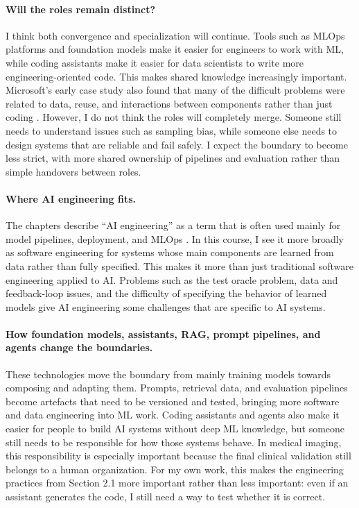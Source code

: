 \documentclass[11pt,a4paper]{article}
\begin{document}
\paragraph{Will the roles remain distinct?}
I think both convergence and specialization will continue. Tools such as MLOps platforms and foundation models make it easier for engineers to work with ML, while coding assistants make it easier for data scientists to write more engineering-oriented code. This makes shared knowledge increasingly important. Microsoft's early case study also found that many of the difficult problems were related to data, reuse, and interactions between components rather than just coding \cite{amershi}. However, I do not think the roles will completely merge. Someone still needs to understand issues such as sampling bias, while someone else needs to design systems that are reliable and fail safely. I expect the boundary to become less strict, with more shared ownership of pipelines and evaluation rather than simple handovers between roles.

\paragraph{Where AI engineering fits.}
The chapters describe ``AI engineering'' as a term that is often used mainly for model pipelines, deployment, and MLOps \cite{kastner}. In this course, I see it more broadly as software engineering for systems whose main components are learned from data rather than fully specified. This makes it more than just traditional software engineering applied to AI. Problems such as the test oracle problem, data and feedback-loop issues, and the difficulty of specifying the behavior of learned models give AI engineering some challenges that are specific to AI systems.

\paragraph{How foundation models, assistants, RAG, prompt pipelines, and agents change the boundaries.}
These technologies move the boundary from mainly training models towards composing and adapting them. Prompts, retrieval data, and evaluation pipelines become artefacts that need to be versioned and tested, bringing more software and data engineering into ML work. Coding assistants and agents also make it easier for people to build AI systems without deep ML knowledge, but someone still needs to be responsible for how those systems behave. In medical imaging, this responsibility is especially important because the final clinical validation still belongs to a human organization. For my own work, this makes the engineering practices from Section 2.1 more important rather than less important: even if an assistant generates the code, I still need a way to test whether it is correct.
\end{document}
